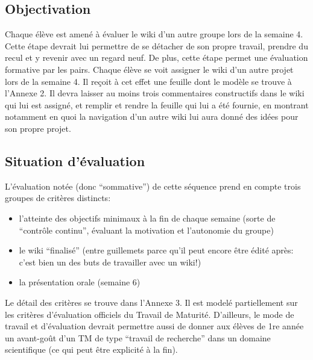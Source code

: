 \documentclass[11pt,bibliography=totoc]{scrartcl}
\begin{document}
\subsection{Objectivation}
Chaque élève est amené à évaluer le wiki d'un autre groupe lors de la semaine
4. Cette étape devrait lui permettre de se détacher de son propre travail,
prendre du recul et y revenir avec un regard neuf. De plus, cette étape permet
une évaluation formative par les pairs. Chaque élève se voit assigner le wiki
d'un autre projet lors de la semaine 4. Il reçoit à cet effet une feuille dont
le modèle se trouve à l'Annexe 2. Il devra laisser au moins trois commentaires
constructifs dans le wiki qui lui est assigné, et remplir et rendre la feuille
qui lui a été fournie, en montrant notamment en quoi la navigation d'un autre
wiki lui aura donné des idées pour son propre projet.

\subsection{Situation d'évaluation}
L'évaluation notée (donc ``sommative'') de cette séquence prend en compte trois
groupes de critères distincts:
\begin{itemize}
\item l'atteinte des objectifs minimaux à la fin de chaque semaine (sorte de
  ``contrôle continu'', évaluant la motivation et l'autonomie du groupe)
\item le wiki ``finalisé'' (entre guillemets parce qu'il peut encore être édité
  après: c'est bien un des buts de travailler avec un wiki!)
\item la présentation orale (semaine 6)
\end{itemize}
Le détail des critères se trouve dans l'Annexe 3. Il est modelé partiellement
sur les critères d'évaluation officiels du Travail de Maturité. D'ailleurs, le
mode de travail et d'évaluation devrait permettre aussi de donner aux élèves de
1re année un avant-goût d'un TM de type ``travail de recherche'' dans un domaine
scientifique (ce qui peut être explicité à la fin).
\end{document}
